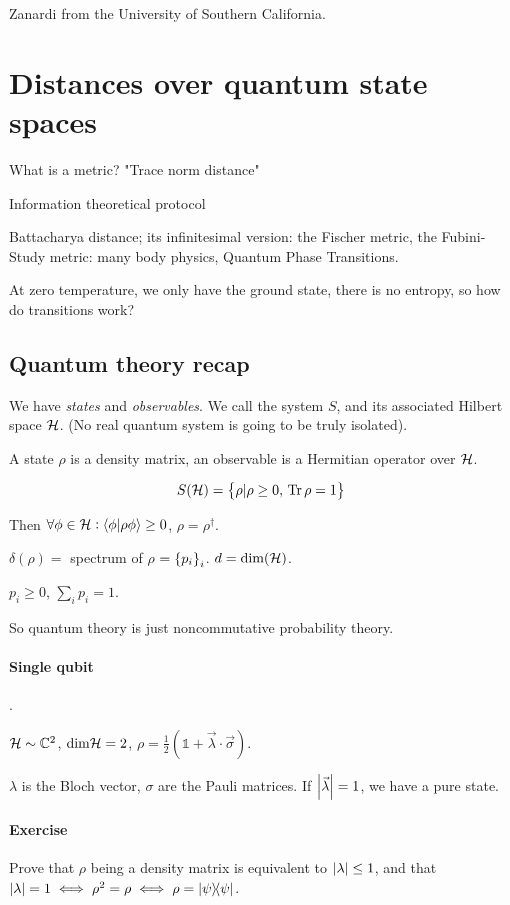 Zanardi from the University of Southern California.

\section{Distances over quantum state spaces}

What is a metric? "Trace norm distance"

Information theoretical protocol

Battacharya distance; its infinitesimal version: the Fischer metric, the Fubini-Study metric: many body physics, Quantum Phase Transitions.

At zero temperature, we only have the ground state, there is no entropy, so how do transitions work?

\subsection{Quantum theory recap}

We have \emph{states} and \emph{observables}. We call the system $S$, and its associated Hilbert space \(\mathcal{H}\). (No real quantum system is going to be truly isolated).

A state \(\rho\) is a density matrix, an observable is a Hermitian operator over \(\mathcal{H}\).

\begin{equation}
  S(\mathcal{H}) = \qty{\rho | \rho \geq 0, \, \Tr \rho = 1}
\end{equation}

Then \(\forall \phi \in \mathcal{H}: \braket{\phi}{\rho \phi} \geq 0\), \(\rho = \rho ^\dag\).

\(\delta (\rho) = \) spectrum of \(\rho\) \(= \qty{p_i}_i\). \(d = \text{dim} (\mathcal{H})\).

\(p_i \geq 0\), \(\sum_i p_i = 1\).

So quantum theory is just noncommutative probability theory.

\paragraph{Single qubit}.

$\mathcal{H} \sim \mathbb{C}^2$, $\text{dim} \mathcal{H} = 2$, $\rho = \frac{1}{2} (\mathbb{1} + \vec{\lambda} \cdot \vec{\sigma})$.

$\lambda$ is the Bloch vector, $\sigma$ are the Pauli matrices.
If $\abs{\vec{\lambda}} = 1$, we have a pure state.

\paragraph{Exercise}
Prove that \(\rho\) being a density matrix is equivalent to $\abs{\lambda}\leq 1$, and that $\abs{\lambda} = 1 \iff \rho^2 = \rho \iff \rho = \ketbra{\psi}$.

